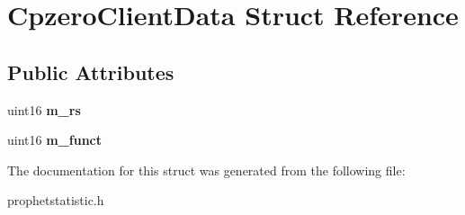 \hypertarget{structCpzeroClientData}{
\section{CpzeroClientData Struct Reference}
\label{structCpzeroClientData}
}
\subsection*{Public Attributes}
\begin{DoxyCompactItemize}
\item 
\hypertarget{structCpzeroClientData_a5aefa110fcd2a37a24ab7925ffd8b7d8}{
uint16 {\bfseries m\_\-rs}}
\label{structCpzeroClientData_a5aefa110fcd2a37a24ab7925ffd8b7d8}

\item 
\hypertarget{structCpzeroClientData_aa2b4ff5398f9157769b5c2b00e61c2c3}{
uint16 {\bfseries m\_\-funct}}
\label{structCpzeroClientData_aa2b4ff5398f9157769b5c2b00e61c2c3}

\end{DoxyCompactItemize}


The documentation for this struct was generated from the following file:\begin{DoxyCompactItemize}
\item 
prophetstatistic.h\end{DoxyCompactItemize}
